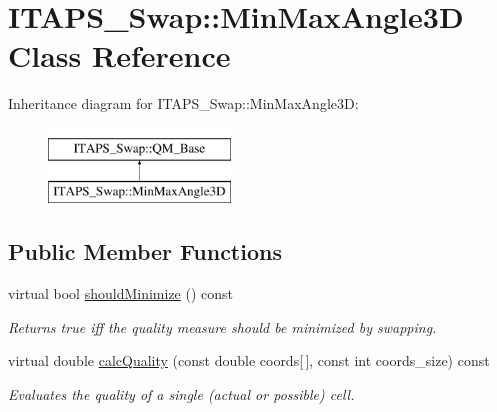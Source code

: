 \hypertarget{class_i_t_a_p_s___swap_1_1_min_max_angle3_d}{
\section{ITAPS\_\-Swap::MinMaxAngle3D Class Reference}
\label{class_i_t_a_p_s___swap_1_1_min_max_angle3_d}
}
Inheritance diagram for ITAPS\_\-Swap::MinMaxAngle3D:\begin{figure}[H]
\begin{center}
\leavevmode
\includegraphics[height=2cm]{class_i_t_a_p_s___swap_1_1_min_max_angle3_d}
\end{center}
\end{figure}
\subsection*{Public Member Functions}
\begin{DoxyCompactItemize}
\item 
\hypertarget{class_i_t_a_p_s___swap_1_1_min_max_angle3_d_a6b564f9cc2b7e79a5358dbfefc48c41c}{
virtual bool \hyperlink{class_i_t_a_p_s___swap_1_1_min_max_angle3_d_a6b564f9cc2b7e79a5358dbfefc48c41c}{shouldMinimize} () const }
\label{class_i_t_a_p_s___swap_1_1_min_max_angle3_d_a6b564f9cc2b7e79a5358dbfefc48c41c}

\begin{DoxyCompactList}\small\item\em Returns true iff the quality measure should be minimized by swapping. \item\end{DoxyCompactList}\item 
virtual double \hyperlink{class_i_t_a_p_s___swap_1_1_min_max_angle3_d_acad0f614af36012501c3aee66c0e85ea}{calcQuality} (const double coords\mbox{[}$\,$\mbox{]}, const int coords\_\-size) const 
\begin{DoxyCompactList}\small\item\em Evaluates the quality of a single (actual or possible) cell. \item\end{DoxyCompactList}\end{DoxyCompactItemize}


